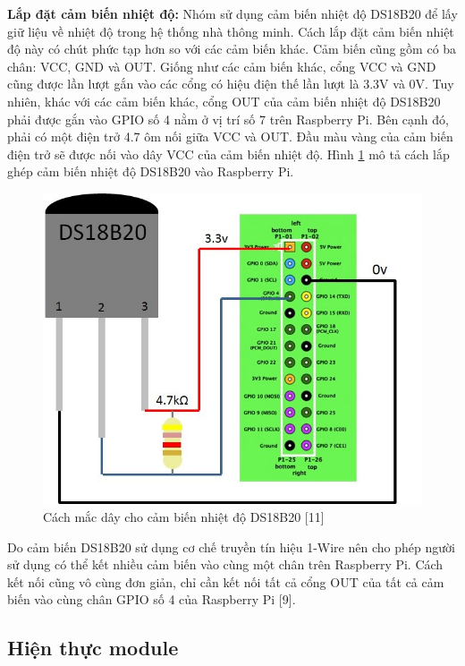 \documentclass[12pt,a4paper,oneside]{extbook}
\begin{document}
\textbf{Lắp đặt cảm biến nhiệt độ:} Nhóm sử dụng cảm biến nhiệt độ DS18B20 để lấy giữ liệu về nhiệt độ trong hệ thống nhà thông minh. Cách lắp đặt cảm biến nhiệt độ này có chút phức tạp hơn so với các cảm biến khác. Cảm biến cũng gồm có ba chân: VCC, GND và OUT. Giống như các cảm biến khác, cổng VCC và GND cũng được lần lượt gắn vào các cổng có hiệu điện thế lần lượt là 3.3V và 0V. Tuy nhiên, khác với các cảm biến khác, cổng OUT của cảm biến nhiệt độ DS18B20 phải được gắn vào GPIO số 4 nằm ở vị trí số 7 trên Raspberry Pi. Bên cạnh đó, phải có một điện trở 4.7 ôm nối giữa VCC và OUT. Đầu màu vàng của cảm biến điện trở sẽ được nối vào dây VCC của cảm biến nhiệt độ. Hình \ref{fig:6-temp-sensor} mô tả cách lắp ghép cảm biến nhiệt độ DS18B20 vào Raspberry Pi.

\begin{figure}[h]
  \centering
     \includegraphics[scale=0.3]{6-temp-sensor}
  \caption{Cách mắc dây cho cảm biến nhiệt độ DS18B20 [11]}\label{fig:6-temp-sensor}
\end{figure}

Do cảm biến DS18B20 sử dụng cơ chế truyền tín hiệu 1-Wire nên cho phép người sử dụng có thể kết nhiều cảm biến vào cùng một chân trên Raspberry Pi. Cách kết nối cũng vô cùng đơn giản, chỉ cần kết nối tất cả cổng OUT của tất cả cảm biến vào cùng chân GPIO số 4 của Raspberry Pi [9].

\subsection{Hiện thực module}
\end{document}
